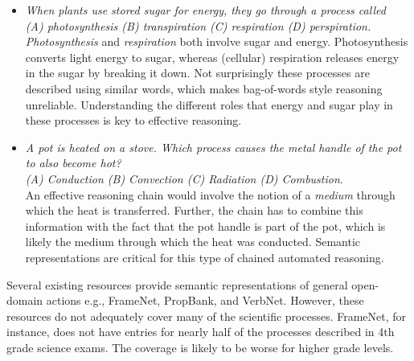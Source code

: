 \begin{itemize}
\item {\em When plants use stored sugar for energy, they go through a process called \\
(A) photosynthesis (B) transpiration (C) respiration (D) perspiration.}\\
{\em Photosynthesis} and {\em respiration} both involve sugar and energy. 
Photosynthesis converts light energy to sugar, whereas (cellular) respiration releases energy in the sugar by breaking it down. 
Not surprisingly these processes are described using similar words, which makes bag-of-words style reasoning unreliable. 
Understanding the different roles that energy and sugar play in these processes is key to effective reasoning.


\item {\em A pot is heated on a stove. Which process causes the metal handle of the pot to also become hot? \\(A) Conduction (B) Convection (C) Radiation (D) Combustion}. \\
An effective reasoning chain would involve the notion of a {\em medium} through which the heat is transferred.
Further, the chain has to combine this information with the fact that the pot handle is part of the pot, which is likely the medium through which the heat was conducted. 
Semantic representations are critical for this type of chained automated reasoning. 

\end{itemize}
Several existing resources provide semantic representations of general open-domain actions e.g., FrameNet, PropBank, and VerbNet. 
However, these resources do not adequately cover many of the scientific processes. 
FrameNet, for instance, does not have entries for nearly half of the processes described in 4th grade science exams. 
The coverage is likely to be worse for higher grade levels.


